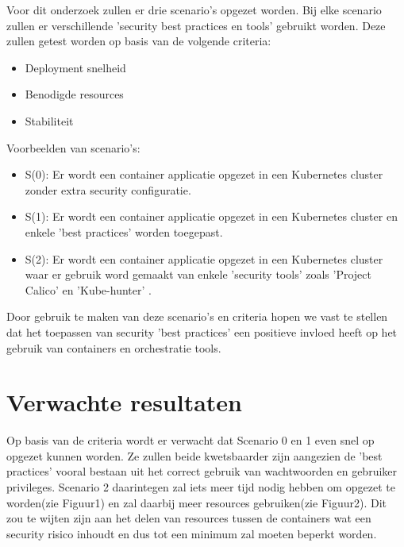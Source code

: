 Voor dit onderzoek zullen er drie scenario's opgezet worden. Bij elke scenario zullen er verschillende 'security best practices en tools' gebruikt worden.
Deze zullen getest worden op basis van de volgende criteria: \newline
\begin{itemize}
	\item Deployment snelheid
	\item Benodigde resources
	\item Stabiliteit \newline
\end{itemize} 
Voorbeelden van scenario's: \newline
\begin{itemize}
	\item S(0): Er wordt een container applicatie opgezet in een Kubernetes cluster zonder extra security configuratie.
	\item S(1): Er wordt een container applicatie opgezet in een Kubernetes cluster en enkele 'best practices' worden toegepast.
	\item S(2): Er wordt een container applicatie opgezet in een Kubernetes cluster waar er gebruik word gemaakt van enkele 'security tools' zoals 'Project Calico' en 'Kube-hunter' . \newline
\end{itemize} 
Door gebruik te maken van deze scenario's en criteria hopen we vast te stellen dat het toepassen van security 'best practices' een positieve invloed heeft op het gebruik van containers en orchestratie tools.

\section{Verwachte resultaten}
\label{sec:verwachte_resultaten}

Op basis van de criteria wordt er verwacht dat Scenario 0 en 1 even snel op opgezet kunnen worden. Ze zullen beide kwetsbaarder zijn aangezien de 'best practices' vooral bestaan uit het correct gebruik van wachtwoorden en gebruiker privileges.
Scenario 2 daarintegen zal iets meer tijd nodig hebben om opgezet te worden(zie Figuur1) en zal daarbij meer resources gebruiken(zie Figuur2). Dit zou te wijten zijn aan het delen van resources tussen de containers wat een security risico inhoudt en dus tot een minimum zal moeten beperkt worden\autocite{Education2019}.

